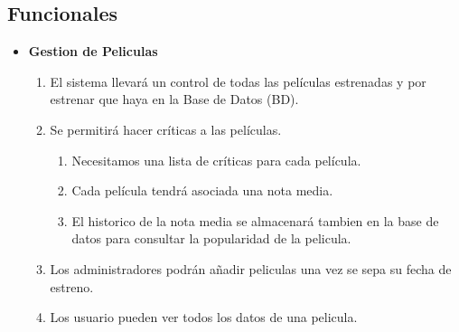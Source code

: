 \documentclass{article}
\begin{document}
    \subsection{Funcionales}
	\begin{itemize}
	
	\item \textbf{Gestion de Peliculas}
		\begin{enumerate}[label=\bfseries RF- \arabic*:]
		\item El sistema llevará un control de todas las películas estrenadas y por estrenar que haya en la Base de Datos (BD).
		\item Se permitirá hacer críticas a las películas.
			\begin{enumerate}[label=\bfseries 2.\arabic*:]
				\item Necesitamos una lista de críticas para cada película.
				\item Cada película tendrá asociada una nota media.
				\item El historico de la nota media se almacenará tambien en la base de datos para consultar la popularidad de la pelicula.
			\end{enumerate}
		\item Los administradores podrán añadir peliculas una vez se sepa su fecha de estreno.
		\item Los usuario pueden ver todos los datos de una pelicula.
		\end{enumerate}
		

\end{itemize}
\end{document}
